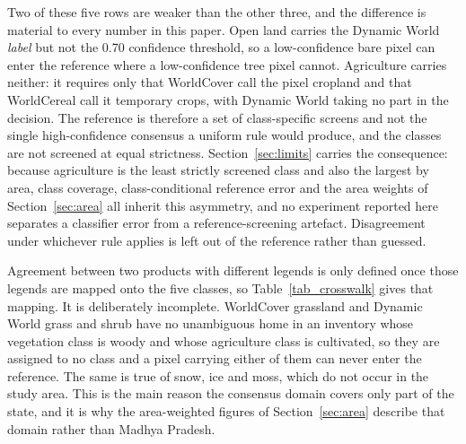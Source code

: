 \documentclass[conference]{IEEEtran}
\begin{document}
Two of these five rows are weaker than the other three, and the difference is material to every number in this paper. Open land carries the Dynamic World \emph{label} but not the 0.70 confidence threshold, so a low-confidence bare pixel can enter the reference where a low-confidence tree pixel cannot. Agriculture carries neither: it requires only that WorldCover call the pixel cropland and that WorldCereal call it temporary crops, with Dynamic World taking no part in the decision. The reference is therefore a set of class-specific screens and not the single high-confidence consensus a uniform rule would produce, and the classes are not screened at equal strictness. Section~\ref{sec:limits} carries the consequence: because agriculture is the least strictly screened class and also the largest by area, class coverage, class-conditional reference error and the area weights of Section~\ref{sec:area} all inherit this asymmetry, and no experiment reported here separates a classifier error from a reference-screening artefact. Disagreement under whichever rule applies is left out of the reference rather than guessed.

Agreement between two products with different legends is only defined once those legends are mapped onto the five classes, so Table~\ref{tab_crosswalk} gives that mapping. It is deliberately incomplete. WorldCover grassland and Dynamic World grass and shrub have no unambiguous home in an inventory whose vegetation class is woody and whose agriculture class is cultivated, so they are assigned to no class and a pixel carrying either of them can never enter the reference. The same is true of snow, ice and moss, which do not occur in the study area. This is the main reason the consensus domain covers only part of the state, and it is why the area-weighted figures of Section~\ref{sec:area} describe that domain rather than Madhya Pradesh.
\end{document}
